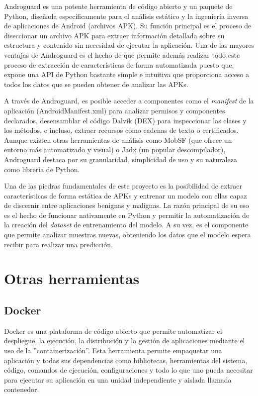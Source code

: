 Androguard es una potente herramienta de código abierto y un paquete de Python, diseñada específicamente para el análisis estático y la ingeniería inversa de aplicaciones de Android (archivos APK). Su función principal es el proceso de diseccionar un archivo APK para extraer información detallada sobre su estructura y contenido sin necesidad de ejecutar la aplicación. Una de las mayores ventajas de Androguard es el hecho de que permite además realizar todo este proceso de extracción de características de forma automatizada puesto que, expone una API de Python bastante simple e intuitiva que proporciona acceso a todos los datos que se pueden obtener de analizar las APKs.

A través de Androguard, es posible acceder a componentes como el \textit{manifest} de la aplicación (AndroidManifest.xml) para analizar permisos y componentes declarados, desensamblar el código Dalvik (DEX) para inspeccionar las clases y los métodos, e incluso, extraer recursos como cadenas de texto o certificados. Aunque existen otras herramientas de análisis como MobSF (que ofrece un entorno más automatizado y visual) o Jadx (un popular descompilador), Androguard destaca por su granularidad, simplicidad de uso y su naturaleza como librería de Python.

Una de las piedras fundamentales de este proyecto es la posibilidad de extraer características de forma estática de APKs y entrenar un modelo con ellas capaz de discernir entre aplicaciones benignas y malignas. La razón principal de su eso es el hecho de funcionar nativamente en Python y permitir la automatización de la creación del \textit{dataset} de entrenamiento del modelo. A su vez, es el componente que permite analizar muestras nuevas, obteniendo los datos que el modelo espera recibir para realizar una predicción.

\section{Otras herramientas}

\subsection{Docker}

Docker es una plataforma de código abierto que permite automatizar el despliegue, la ejecución, la distribución y la gestión de aplicaciones mediante el uso de la ''containerización''. Esta herramienta permite empaquetar una aplicación y todas sus dependencias como bibliotecas, herramientas del sistema, código, comandos de ejecución, configuraciones y todo lo que uno pueda necesitar para ejecutar su aplicación en una unidad independiente y aislada llamada contenedor.

